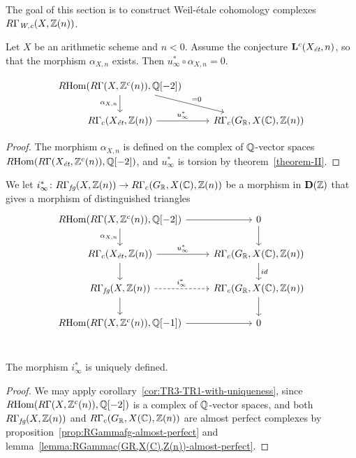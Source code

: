 \documentclass{article}
\numberwithin{equation}{section}
\begin{document}
The goal of this section is to construct Weil-étale cohomology complexes
$R\Gamma_\Wc (X, \ZZ(n))$.

\begin{lemma}
  Let $X$ be an arithmetic scheme and $n < 0$. Assume the conjecture
  $\mathbf{L}^c (X_\et, n)$, so that the morphism $\alpha_{X,n}$ exists.
  Then $u_\infty^* \circ \alpha_{X,n} = 0$.

  \[ \begin{tikzcd}
    \RHom (R\Gamma (X, \ZZ^c (n)), \QQ [-2]) \ar{d}[swap]{\alpha_{X,n}}\ar{dr}{= 0} \\
      R\Gamma_c (X_\et, \ZZ (n)) \ar{r}{u_\infty^*} & R\Gamma_c (G_\RR, X (\CC), \ZZ (n))
    \end{tikzcd} \]

  \begin{proof}
    The morphism $\alpha_{X,n}$ is defined on the complex of $\QQ$-vector spaces
    $\RHom (R\Gamma (X_\et, \ZZ^c (n)), \QQ [-2])$, and $u_\infty^*$ is torsion
    by theorem~\ref{theorem-II}.
  \end{proof}
\end{lemma}

\begin{definition}
  \label{dfn:i-infty}
  We let
  $i_\infty^*\colon R\Gamma_\fg (X, \ZZ (n)) \to R\Gamma_c (G_\RR, X (\CC), \ZZ (n))$
  be a morphism in $\mathbf{D} (\ZZ)$ that gives a morphism of distinguished
  triangles
  \begin{equation}
    \label{eqn:triangle-defining-i-infty}
    \begin{tikzcd}
      \RHom (R\Gamma (X, \ZZ^c (n)), \QQ [-2]) \ar{d}[swap]{\alpha_{X,n}}\ar{r} & 0\ar{d} \\
      R\Gamma_c (X_\et, \ZZ (n)) \ar{r}{u_\infty^*}\ar{d} &  R\Gamma_c (G_\RR, X (\CC), \ZZ (n)) \ar{d}{id} \\
      R\Gamma_\fg (X, \ZZ (n)) \ar[dashed]{r}{i_\infty^*}\ar{d} & R\Gamma_c (G_\RR, X (\CC), \ZZ (n)) \ar{d} \\
      \RHom (R\Gamma (X, \ZZ^c (n)), \QQ [-1])\ar{r} & 0 \\
    \end{tikzcd}
  \end{equation}
\end{definition}

\begin{proposition}
  \label{prop:uniqueness-of-i-infty}
  The morphism $i_\infty^*$ is uniquely defined.

  \begin{proof}
    We may apply corollary~\ref{cor:TR3-TR1-with-uniqueness}, since
    $\RHom (R\Gamma (X, \ZZ^c (n)), \QQ [-2])$ is a complex of $\QQ$-vector
    spaces, and both
    $R\Gamma_\fg (X, \ZZ (n))$ and
    $R\Gamma_c (G_\RR, X (\CC), \ZZ (n))$
    are almost perfect complexes by
    proposition~\ref{prop:RGammafg-almost-perfect} and
    lemma~\ref{lemma:RGammac(GR,X(C),Z(n))-almost-perfect}.
  \end{proof}
\end{proposition}
\end{document}
